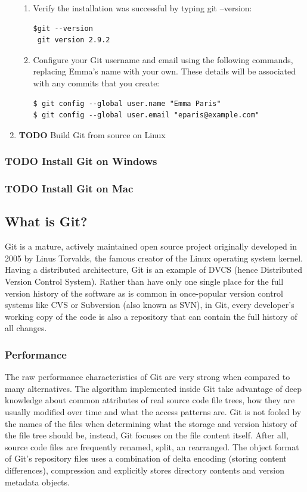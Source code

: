 \documentclass[11pt]{article}
\begin{document}
\begin{enumerate}
\begin{enumerate}
\item Verify the installation was successful by typing git --version:
\begin{verbatim}
$git --version
 git version 2.9.2
\end{verbatim}

\item Configure your Git username and email using the following commands, replacing Emma's name with your own. These details will be associated with any commits that you create:
\begin{verbatim}
$ git config --global user.name "Emma Paris"
$ git config --global user.email "eparis@example.com"
\end{verbatim}
\end{enumerate}
\item {\bfseries\sffamily TODO} Build Git from source on Linux
\label{sec-1-2-1-4}
\end{enumerate}
\subsubsection{{\bfseries\sffamily TODO} Install Git on Windows}
\label{sec-1-2-2}
\subsubsection{{\bfseries\sffamily TODO} Install Git on Mac}
\label{sec-1-2-3}
\subsection{What is Git?}
\label{sec-1-3}
Git is a mature, actively maintained open source project originally developed in 2005 by Linus Torvalds, the famous creator of the Linux operating system kernel. Having a distributed architecture, Git is an example of DVCS (hence Distributed Version Control System). Rather than have only one single place for the full version history of the software as is common in once-popular version control systems like CVS or Subversion (also known as SVN), in Git, every developer's working copy of the code is also a repository that can contain the full history of all changes.

\subsubsection{Performance}
\label{sec-1-3-1}
The raw performance characteristics of Git are very strong when compared to many alternatives. The algorithm implemented inside Git take advantage of deep knowledge about common attributes of real source code file trees, how they are usually modified over time and what the access patterns are. Git is not fooled by the names of the files when determining what the storage and version history of the file tree should be, instead, Git focuses on the file content itself. After all, source code files are frequently renamed, split, an rearranged. The object format of Git's repository files uses a combination of delta encoding (storing content differences), compression and explicitly stores directory contents and version metadata objects.
\end{document}
